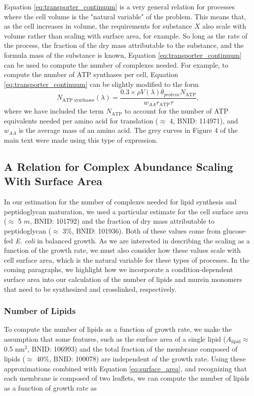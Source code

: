 Equation \ref{eq:transporter_continuum} is a very general relation for processes where the
cell volume is the "natural variable" of the problem. This means that, as the
cell increases in volume, the requirements for substance $X$ also scale with
volume rather than scaling with surface area, for example. So long as the rate
of the process, the fraction of the dry mass attributable to the substance, and
the formula mass of the substance is known, Equation \ref{eq:transporter_continuum} can be
used to compute the number of complexes needed. For example, to compute the
number of ATP synthases per cell, Equation \ref{eq:transporter_continuum} can be slightly
modified to the form
\begin{equation}
    N_\text{ATP synthases}(\lambda) = \frac{0.3 \times \rho V(\lambda)\theta_{protein}N_\text{ATP}}{w_{AA} r_\text{ATP} \tau},
\end{equation}
where we have included the term $N_\text{ATP}$ to account for the number of ATP
equivalents needed per amino acid for translation ($\approx$ 4, BNID: 114971),
and $w_{AA}$ is the average mass of an amino acid. The grey curves in Figure 4
of the main text were made using this type of expression.

\subsection{A Relation for Complex Abundance Scaling With Surface Area}
In our estimation for the number of complexes needed for lipid synthesis and
peptidoglycan maturation, we used a particular estimate for the cell surface
area ($\approx$ 5 \textmu$m$, BNID: 101792) and the fraction of dry mass
attributable to peptidoglycan ($\approx$ 3\%, BNID: 101936). Both of these
values come from glucose-fed \textit{E. coli} in balanced growth. As we are
interested in describing the scaling as a function of the growth rate, we must
also consider how these values scale with cell surface area, which is the natural
variable for these types of processes. In the coming paragraphs, we highlight
how we incorporate a condition-dependent surface area into our calculation of
the number of lipids and murein monomers that need to be synthesized and
crosslinked, respectively.

\subsubsection{Number of Lipids}
To compute the number of lipids as a function of growth rate, we make the
assumption that some features, such as the surface area of a single lipid
($A_\text{lipid} \approx$ 0.5 nm$^2$, BNID: 106993) and the total fraction of the membrane
composed of lipids ($\approx$ 40\%, BNID: 100078) are independent of the growth
rate. Using these approximations combined with Equation \ref{eq:surface_area}, and
recognizing that each membrane is composed of two leaflets, we can
compute the number of lipids as a function of growth rate as

